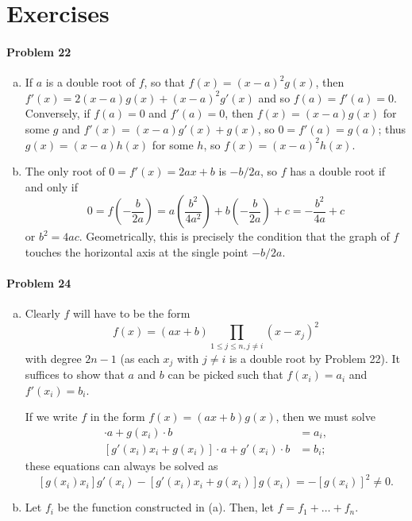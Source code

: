 \documentclass{article}
\begin{document}
\section*{Exercises}

\paragraph{Problem 22}
\begin{enumerate}[(a)]
  \item If $a$ is a double root of $f$, so that $f(x) = (x - a)^2 g(x)$, then
    $f'(x) = 2(x - a)g(x) + (x - a)^2g'(x)$ and so $f(a) = f'(a) = 0$.
    Conversely, if $f(a) = 0$ and $f'(a) = 0$, then $f(x) = (x - a)g(x)$ for
    some $g$ and $f'(x) = (x - a)g'(x) + g(x)$, so $0 = f'(a) = g(a)$; thus
    $g(x) = (x - a)h(x)$ for some $h$, so $f(x) = (x - a)^2h(x)$.
  \item The only root of $0 = f'(x) = 2ax + b$ is $-b/2a$, so $f$ has a double
    root if and only if \[
      0
      = f\left( -\frac{b}{2a} \right)
      = a\left( \frac{b^2}{4a^2} \right) + b\left( -\frac{b}{2a} \right) + c
      = -\frac{b^2}{4a} + c
    \] or $b^2 = 4ac$. Geometrically, this is precisely the condition that the
    graph of $f$ touches the horizontal axis at the single point $-b/2a$.
\end{enumerate}

\paragraph{Problem 24}
\begin{enumerate}[(a)]
  \item Clearly $f$ will have to be the form \[
      f(x) = (ax + b)\prod_{1 \leq j \leq n, j \neq i}{(x - x_j)^2}
    \] with degree $2n - 1$ (as each $x_j$ with $j \neq i$ is a double root by
    Problem 22). It suffices to show that $a$ and $b$ can be picked such that
    $f(x_i) = a_i$ and $f'(x_i) = b_i$.

    If we write $f$ in the form $f(x) = (ax + b)g(x)$, then we must solve
    \begin{align*}
      [g(x_i)x_i] \cdot a + g(x_i) \cdot b &= a_i, \\
      [g'(x_i)x_i + g(x_i)] \cdot a + g'(x_i) \cdot b &= b_i;
    \end{align*}
    these equations can always be solved as \[
      [g(x_i)x_i]g'(x_i) - [g'(x_i)x_i + g(x_i)]g(x_i) = -[g(x_i)]^2 \neq 0.
    \]
  \item Let $f_i$ be the function constructed in (a). Then, let $f = f_1 +
    \ldots + f_n$.
\end{enumerate}
\end{document}
